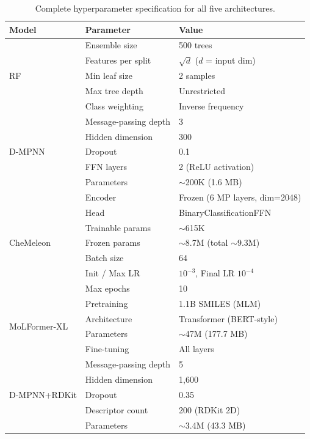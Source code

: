 \documentclass{article}
\begin{document}
\begin{table}[ht]
\caption{Complete hyperparameter specification for all five architectures.}
\label{tab:hyperparams}
\centering
\scriptsize
\setlength{\tabcolsep}{2.5pt}
\begin{tabular}{lll}
\toprule
\textbf{Model} & \textbf{Parameter} & \textbf{Value} \\
\midrule
\multirow{5}{*}{RF} & Ensemble size & 500 trees \\
& Features per split & $\sqrt{d}$ ($d$ = input dim) \\
& Min leaf size & 2 samples \\
& Max tree depth & Unrestricted \\
& Class weighting & Inverse frequency \\
\midrule
\multirow{5}{*}{D-MPNN} & Message-passing depth & 3 \\
& Hidden dimension & 300 \\
& Dropout & 0.1 \\
& FFN layers & 2 (ReLU activation) \\
& Parameters & ${\sim}$200K (1.6 MB) \\
\midrule
\multirow{7}{*}{CheMeleon} & Encoder & Frozen (6 MP layers, dim=2048) \\
& Head & BinaryClassificationFFN \\
& Trainable params & ${\sim}$615K \\
& Frozen params & ${\sim}$8.7M (total ${\sim}$9.3M) \\
& Batch size & 64 \\
& Init / Max LR & $10^{-3}$, Final LR $10^{-4}$ \\
& Max epochs & 10 \\
\midrule
\multirow{4}{*}{MoLFormer-XL} & Pretraining & 1.1B SMILES (MLM) \\
& Architecture & Transformer (BERT-style) \\
& Parameters & ${\sim}$47M (177.7 MB) \\
& Fine-tuning & All layers \\
\midrule
\multirow{5}{*}{D-MPNN+RDKit} & Message-passing depth & 5 \\
& Hidden dimension & 1,600 \\
& Dropout & 0.35 \\
& Descriptor count & 200 (RDKit 2D) \\
& Parameters & ${\sim}$3.4M (43.3 MB) \\
\bottomrule
\end{tabular}
\end{table}
\end{document}
